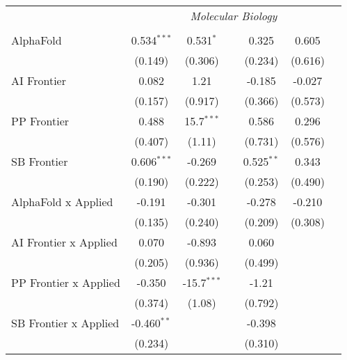 \begin{tabular}{lcccccc}
 & \multicolumn{6}{c}{\textit{Molecular Biology}} \\ \\
   AlphaFold                      & 0.534$^{***}$ & 0.531$^{*}$   &               & 0.325        & 0.605   &   \\   
                                  & (0.149)       & (0.306)       &               & (0.234)      & (0.616) &   \\   
   AI Frontier                    & 0.082         & 1.21          &               & -0.185       & -0.027  &   \\   
                                  & (0.157)       & (0.917)       &               & (0.366)      & (0.573) &   \\   
   PP Frontier                    & 0.488         & 15.7$^{***}$  &               & 0.586        & 0.296   &   \\   
                                  & (0.407)       & (1.11)        &               & (0.731)      & (0.576) &   \\   
   SB Frontier                    & 0.606$^{***}$ & -0.269        &               & 0.525$^{**}$ & 0.343   &   \\   
                                  & (0.190)       & (0.222)       &               & (0.253)      & (0.490) &   \\   
   AlphaFold x Applied            & -0.191        & -0.301        &               & -0.278       & -0.210  &   \\   
                                  & (0.135)       & (0.240)       &               & (0.209)      & (0.308) &   \\   
   AI Frontier x Applied          & 0.070         & -0.893        &               & 0.060        &         &   \\   
                                  & (0.205)       & (0.936)       &               & (0.499)      &         &   \\   
   PP Frontier x Applied          & -0.350        & -15.7$^{***}$ &               & -1.21        &         &   \\   
                                  & (0.374)       & (1.08)        &               & (0.792)      &         &   \\   
   SB Frontier x Applied          & -0.460$^{**}$ &               &               & -0.398       &         &   \\   
                                  & (0.234)       &               &               & (0.310)      &         &   \\   

\end{tabular}
